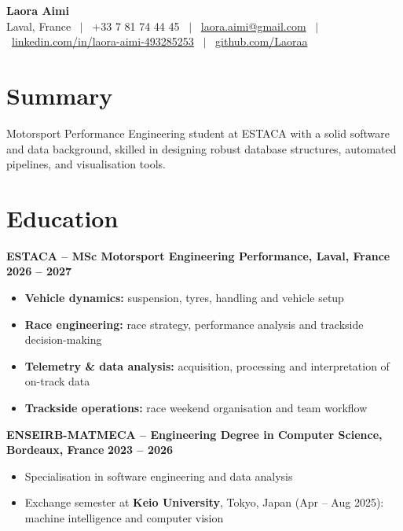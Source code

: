 \documentclass[10pt,a4paper]{article}
\newcommand{\entryone}[2]{%
  \textbf{#1} \hfill \textbf{#2}\par\vspace{-2pt}
}
\begin{document}
\begin{center}
  {\huge\bfseries Laora Aimi}\\[4pt]
  Laval, France \ $|$ \ +33 7 81 74 44 45 \ $|$ \
  \href{mailto:laora.aimi@gmail.com}{laora.aimi@gmail.com} \ $|$ \
  \href{https://www.linkedin.com/in/laora-aimi-493285253}{linkedin.com/in/laora-aimi-493285253} \ $|$ \
  \href{https://github.com/Laoraa}{github.com/Laoraa}
\end{center}

\vspace{-4pt}
\section{Summary}
Motorsport Performance Engineering student at ESTACA with a solid software and data background, skilled in designing robust database structures, automated pipelines, and visualisation tools.

\section{Education}

\entryone{ESTACA -- MSc Motorsport Engineering Performance, Laval, France}{2026 -- 2027}
\begin{itemize}
  \item \textbf{Vehicle dynamics:} suspension, tyres, handling and vehicle setup
  \item \textbf{Race engineering:} race strategy, performance analysis and trackside decision-making
  \item \textbf{Telemetry \& data analysis:} acquisition, processing and interpretation of on-track data
  \item \textbf{Trackside operations:} race weekend organisation and team workflow
\end{itemize}

\vspace{2pt}
\entryone{ENSEIRB-MATMECA -- Engineering Degree in Computer Science, Bordeaux, France}{2023 -- 2026}
\begin{itemize}
  \item Specialisation in software engineering and data analysis
  \item Exchange semester at \textbf{Keio University}, Tokyo, Japan (Apr -- Aug 2025): machine intelligence and computer vision
\end{itemize}
\end{document}
